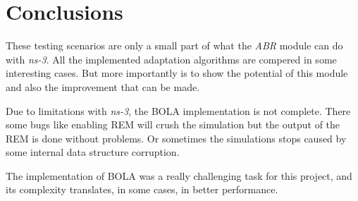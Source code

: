 \clearpage

\section{Conclusions}
\label{sec:simconclu}

These testing scenarios are only a small part of what the \textit{ABR} module can do with \textit{ns-3}.
All the implemented adaptation algorithms are compered in some interesting cases. But more importantly
is to show the potential of this module and also the improvement that can be made. 

Due to limitations with \textit{ns-3}, the BOLA implementation is not complete. There some 
bugs like enabling REM will crush the simulation but the output of the REM is done without
problems. Or sometimes the simulations stops caused by some internal data structure corruption.

The implementation of BOLA was a really challenging task for this project, and its complexity 
translates, in some cases, in better performance.